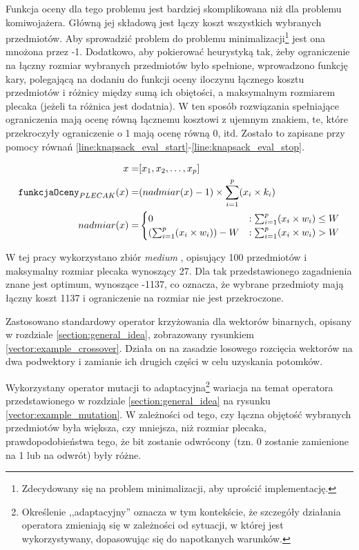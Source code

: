 \documentclass[./FM_mgr.tex]{subfiles}
\begin{document}
Funkcja oceny dla tego problemu jest bardziej skomplikowana niż dla problemu komiwojażera. Główną jej składową jest łączy koszt wszystkich wybranych przedmiotów.
Aby sprowadzić problem do problemu minimalizacji\footnote{
	Zdecydowany się na problem minimalizacji, aby uprościć implementację.
} jest ona mnożona przez -1.
Dodatkowo, aby pokierować heurystyką tak, żeby ograniczenie na łączny rozmiar wybranych przedmiotów było spełnione, wprowadzono funkcję kary, polegającą na dodaniu do funkcji oceny iloczynu łącznego kosztu przedmiotów i różnicy między sumą ich obiętości, a maksymalnym rozmiarem plecaka (jeżeli ta różnica jest dodatnia).
W ten sposób rozwiązania spełniające ograniczenia mają ocenę równą łącznemu kosztowi z ujemnym znakiem, te, które przekroczyły ograniczenie o 1 mają ocenę równą 0, itd.
Zostało to zapisane przy pomocy równań \ref{line:knapsack_eval_start}-\ref{line:knapsack_eval_stop}.

\begin{align}
\label{line:knapsack_eval_start}
x = &[x_1, x_2, \ldots, x_p] \\
\mathtt{funkcjaOceny}_{PLECAK}(x) = &(nadmiar(x)-1) \times \sum_{i=1}^{p} (x_i \times k_i) \\
nadmiar(x) = &\begin{cases}
0 &: \sum_{i=1}^{p} (x_i \times w_i) \leq W \\
(\sum_{i=1}^{p} (x_i \times w_i)) - W &: \sum_{i=1}^{p} (x_i \times w_i) > W
\end{cases}
\label{line:knapsack_eval_stop}
\end{align}

W tej pracy wykorzystano zbiór \emph{medium} \cite{knapsack_data}, opisujący 100 przedmiotów i maksymalny rozmiar plecaka wynoszący 27.
Dla tak przedstawionego zagadnienia znane jest optimum, wynoszące -1137, co oznacza, że wybrane przedmioty mają łączny koszt 1137 i ograniczenie na rozmiar nie jest przekroczone.

Zastosowano standardowy operator krzyżowania dla wektorów binarnych, opisany w rozdziale \ref{section:general_idea}, zobrazowany rysunkiem \ref{vector:example_crossover}.
Działa on na zasadzie losowego rozcięcia wektorów na dwa podwektory i zamianie ich drugich części w celu uzyskania potomków.

Wykorzystany operator mutacji to adaptacyjna\footnote{
	Określenie ,,adaptacyjny'' oznacza w tym kontekście, że szczegóły działania operatora zmieniają się w zależności od sytuacji, w której jest wykorzystywany, dopasowując się do napotkanych warunków.
} wariacja na temat operatora przedstawionego w rozdziale \ref{section:general_idea} na rysunku \ref{vector:example_mutation}.
W zależności od tego, czy łączna objętość wybranych przedmiotów była większa, czy mniejsza, niż rozmiar plecaka, prawdopodobieństwa tego, że bit zostanie odwrócony (tzn. 0 zostanie zamienione na 1 lub na odwrót) były różne.
\end{document}
